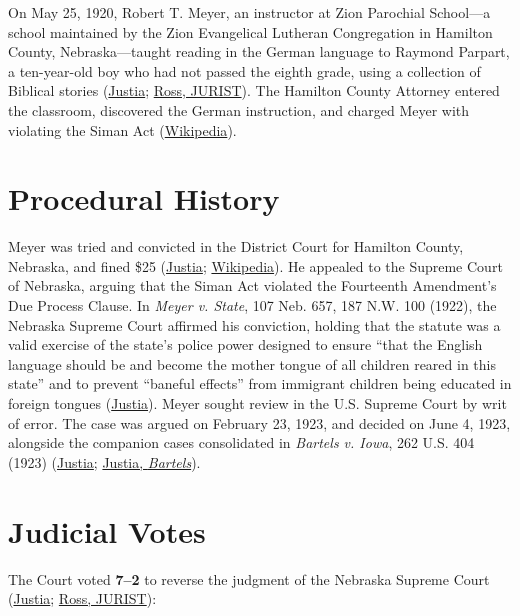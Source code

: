\documentclass[12pt]{article}
\begin{document}
On May 25, 1920, Robert T. Meyer, an instructor at Zion Parochial School---a school maintained by the Zion Evangelical Lutheran Congregation in Hamilton County, Nebraska---taught reading in the German language to Raymond Parpart, a ten-year-old boy who had not passed the eighth grade, using a collection of Biblical stories (\href{https://supreme.justia.com/cases/federal/us/262/390/}{Justia}; \href{https://www.jurist.org/commentary/2023/06/meyer-v-nebraska/}{Ross, JURIST}). The Hamilton County Attorney entered the classroom, discovered the German instruction, and charged Meyer with violating the Siman Act (\href{https://en.wikipedia.org/wiki/Meyer_v._Nebraska}{Wikipedia}).

\section{Procedural History}

Meyer was tried and convicted in the District Court for Hamilton County, Nebraska, and fined \$25 (\href{https://supreme.justia.com/cases/federal/us/262/390/}{Justia}; \href{https://en.wikipedia.org/wiki/Meyer_v._Nebraska}{Wikipedia}). He appealed to the Supreme Court of Nebraska, arguing that the Siman Act violated the Fourteenth Amendment's Due Process Clause. In \textit{Meyer v. State}, 107 Neb. 657, 187 N.W. 100 (1922), the Nebraska Supreme Court affirmed his conviction, holding that the statute was a valid exercise of the state's police power designed to ensure ``that the English language should be and become the mother tongue of all children reared in this state'' and to prevent ``baneful effects'' from immigrant children being educated in foreign tongues (\href{https://supreme.justia.com/cases/federal/us/262/390/}{Justia}). Meyer sought review in the U.S. Supreme Court by writ of error. The case was argued on February 23, 1923, and decided on June 4, 1923, alongside the companion cases consolidated in \textit{Bartels v. Iowa}, 262 U.S. 404 (1923) (\href{https://supreme.justia.com/cases/federal/us/262/390/}{Justia}; \href{https://supreme.justia.com/cases/federal/us/262/404/}{Justia, \textit{Bartels}}).

\section{Judicial Votes}

The Court voted \textbf{7--2} to reverse the judgment of the Nebraska Supreme Court (\href{https://supreme.justia.com/cases/federal/us/262/390/}{Justia}; \href{https://www.jurist.org/commentary/2023/06/meyer-v-nebraska/}{Ross, JURIST}):
\end{document}
